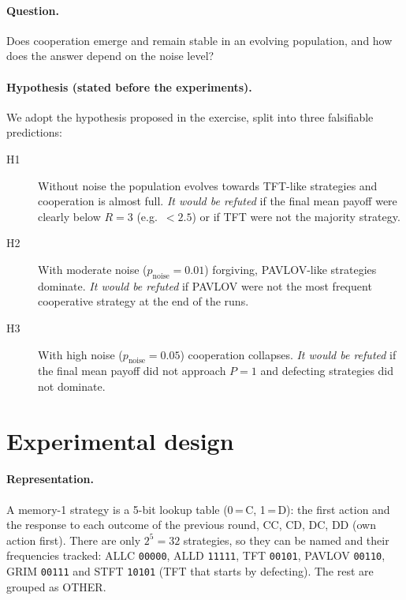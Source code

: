 \documentclass[10pt,a4paper]{article}
\newcommand{\pn}{p_{\text{noise}}}
\newcommand{\g}[1]{\texttt{#1}}   %
\begin{document}
\paragraph{Question.} Does cooperation emerge and remain stable in an evolving population, and how does
the answer depend on the noise level?

\paragraph{Hypothesis (stated before the experiments).} We adopt the hypothesis proposed in the exercise,
split into three falsifiable predictions:
\begin{description}
  \item[H1] Without noise the population evolves towards TFT-like strategies and cooperation is almost
        full. \emph{It would be refuted} if the final mean payoff were clearly below $R=3$ (e.g.\ $<2.5$)
        or if TFT were not the majority strategy.
  \item[H2] With moderate noise ($\pn=0.01$) forgiving, PAVLOV-like strategies dominate. \emph{It would be
        refuted} if PAVLOV were not the most frequent cooperative strategy at the end of the runs.
  \item[H3] With high noise ($\pn=0.05$) cooperation collapses. \emph{It would be refuted} if the final mean
        payoff did not approach $P=1$ and defecting strategies did not dominate.
\end{description}

\section{Experimental design}
\paragraph{Representation.} A memory-1 strategy is a 5-bit lookup table (0\,=\,C, 1\,=\,D): the first
action and the response to each outcome of the previous round, CC, CD, DC, DD (own action first). There
are only $2^5=32$ strategies, so they can be named and their frequencies tracked: ALLC \g{00000}, ALLD
\g{11111}, TFT \g{00101}, PAVLOV \g{00110}, GRIM \g{00111} and STFT \g{10101} (TFT that starts by
defecting). The rest are grouped as OTHER.
\end{document}
